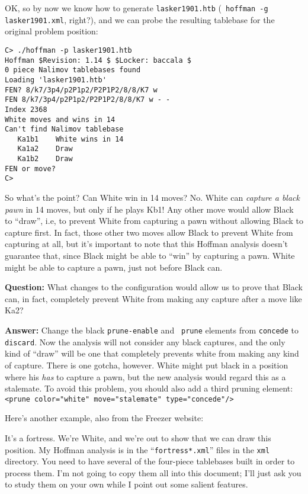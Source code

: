 \documentclass[11pt]{article}
\begin{document}
OK, so by now we know how to generate {\tt lasker1901.htb} ({\tt
hoffman -g lasker1901.xml}, right?), and we can probe the resulting
tablebase for the original problem position:

\begin{verbatim}
C> ./hoffman -p lasker1901.htb
Hoffman $Revision: 1.14 $ $Locker: baccala $
0 piece Nalimov tablebases found
Loading 'lasker1901.htb'
FEN? 8/k7/3p4/p2P1p2/P2P1P2/8/8/K7 w
FEN 8/k7/3p4/p2P1p2/P2P1P2/8/8/K7 w - -
Index 2368
White moves and wins in 14
Can't find Nalimov tablebase
   Ka1b1    White wins in 14
   Ka1a2    Draw
   Ka1b2    Draw
FEN or move?
C>
\end{verbatim}

So what's the point?  Can White win in 14 moves?  No.  White can {\it
capture a black pawn} in 14 moves, but only if he plays Kb1!  Any
other move would allow Black to ``draw'', i.e, to prevent White from
capturing a pawn without allowing Black to capture first.  In fact,
those other two moves allow Black to prevent White from capturing at
all, but it's important to note that this Hoffman analysis doesn't
guarantee that, since Black might be able to ``win'' by capturing a
pawn.  White might be able to capture a pawn, just not before Black
can.

{\bf Question:} What changes to the configuration would allow us to
prove that Black can, in fact, completely prevent White from making
any capture after a move like Ka2?

{\bf Answer:} Change the black {\tt prune-enable} and {\tt
prune} elements from {\tt concede} to {\tt discard}.  Now the analysis
will not consider any black captures, and the only kind of ``draw''
will be one that completely prevents white from making any kind of
capture.  There is one gotcha, however.  White might put black in a
position where his {\it has} to capture a pawn, but the new analysis
would regard this as a stalemate.  To avoid this problem, you should
also add a third pruning element: {\tt <prune color="white"
move="stalemate" type="concede"/>}

Here's another example, also from the Freezer website:

\showboard

It's a fortress.  We're White, and we're out to show that we can draw
this position.  My Hoffman analysis is in the ``{\tt fortress*.xml}''
files in the {\tt xml} directory.  You need to have several of
the four-piece tablebases built in order to process them.  I'm not
going to copy them all into this document; I'll just ask you to study
them on your own while I point out some salient features.
\end{document}
